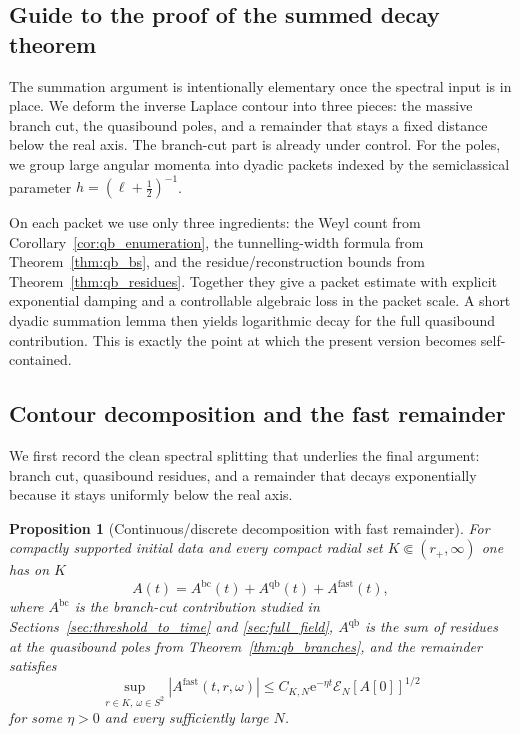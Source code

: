 \documentclass[12pt]{article}
\numberwithin{equation}{section}
\theoremstyle{plain}
\newtheorem{proposition}[theorem]{Proposition}
\theoremstyle{definition}
\theoremstyle{remark}
\newcommand{\ee}{\mathrm e}
\newcommand{\bc}{\mathrm{bc}}
\newcommand{\qb}{\mathrm{qb}}
\newcommand{\fast}{\mathrm{fast}}
\newcommand{\abs}[1]{\left|#1\right|}
\begin{document}
\subsection{Guide to the proof of the summed decay theorem}

The summation argument is intentionally elementary once the spectral input is in place.  We deform the inverse Laplace contour into three pieces: the massive branch cut, the quasibound poles, and a remainder that stays a fixed distance below the real axis.  The branch-cut part is already under control.  For the poles, we group large angular momenta into dyadic packets indexed by the semiclassical parameter $h=(\ell+\tfrac12)^{-1}$.

On each packet we use only three ingredients: the Weyl count from Corollary~\ref{cor:qb_enumeration}, the tunnelling-width formula from Theorem~\ref{thm:qb_bs}, and the residue/reconstruction bounds from Theorem~\ref{thm:qb_residues}.  Together they give a packet estimate with explicit exponential damping and a controllable algebraic loss in the packet scale.  A short dyadic summation lemma then yields logarithmic decay for the full quasibound contribution.  This is exactly the point at which the present version becomes self-contained.

\subsection{Contour decomposition and the fast remainder}

We first record the clean spectral splitting that underlies the final argument: branch cut, quasibound residues, and a remainder that decays exponentially because it stays uniformly below the real axis.

\begin{proposition}[Continuous/discrete decomposition with fast remainder]\label{prop:full_decomposition}
For compactly supported initial data and every compact radial set $K\Subset(r_+,\infty)$ one has on $K$
\begin{equation}\label{eq:full_decomposition}
   A(t)=A^{\bc}(t)+A^{\qb}(t)+A^{\fast}(t),
\end{equation}
where $A^{\bc}$ is the branch-cut contribution studied in Sections~\ref{sec:threshold_to_time} and \ref{sec:full_field}, $A^{\qb}$ is the sum of residues at the quasibound poles from Theorem~\ref{thm:qb_branches}, and the remainder satisfies
\[
   \sup_{r\in K,\,\omega\in S^2}\abs{A^{\fast}(t,r,\omega)}
   \le C_{K,N}\ee^{-\eta t}\mathcal E_N[A[0]]^{1/2}
\]
for some $\eta>0$ and every sufficiently large $N$.
\end{proposition}
\end{document}
